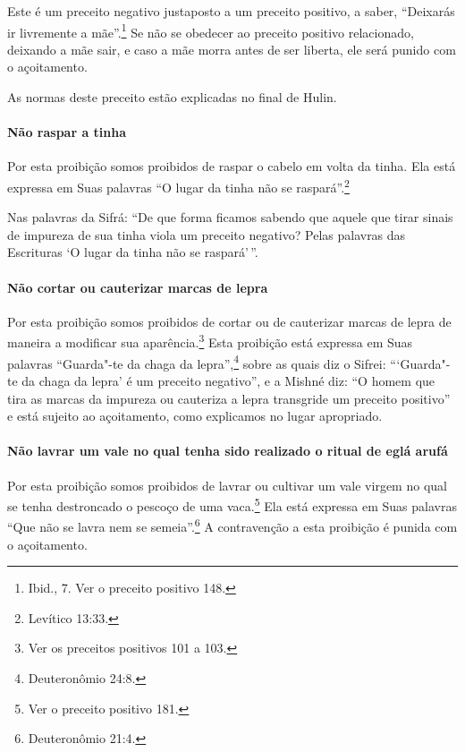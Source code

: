 \begin{multicols}{2}
Este é um preceito negativo justaposto a um preceito positivo, a saber,
``Deixarás ir livremente a mãe''.\footnote{Ibid., 7. Ver o preceito positivo 148.} Se não
se obedecer ao preceito positivo relacionado, deixando a mãe sair, e caso a mãe morra antes de ser liberta, ele será punido com o açoitamento.

As normas deste preceito estão explicadas no final de Hulin\starr.

\paragraph{Não raspar a tinha}

Por esta proibição somos proibidos de raspar o cabelo em volta da tinha.
Ela está expressa em Suas palavras ``O lugar da tinha não se raspará''.\footnote{Levítico 13:33.}

Nas palavras da Sifrá\starr: ``De que forma ficamos sabendo que aquele que
tirar sinais de impureza de sua tinha viola um preceito negativo? Pelas
palavras das Escrituras `O lugar da tinha não se raspará'\,''.

\paragraph{Não cortar ou cauterizar marcas de lepra}

Por esta proibição somos proibidos de cortar ou de cauterizar marcas de lepra de maneira a modificar sua aparência.\footnote{Ver os preceitos positivos 101 a 103.}
Esta proibição está expressa em Suas palavras ``Guarda"-te da chaga da
lepra'',\footnote{Deuteronômio 24:8.} sobre as quais diz o Sifrei\starr: ```Guarda"-te
da chaga da lepra' é um preceito negativo'', e a Mishné diz: ``O homem
que tira as marcas da impureza ou cauteriza a lepra transgride um
preceito positivo'' e está sujeito ao açoitamento, como explicamos no
lugar apropriado.

\paragraph{Não lavrar um vale no qual tenha sido realizado o ritual de eglá arufá\starr}

Por esta proibição somos proibidos de lavrar ou cultivar um vale virgem
no qual se tenha destroncado o pescoço de uma
vaca.\footnote{Ver o preceito positivo 181.} Ela está expressa em Suas palavras ``Que
não se lavra nem se semeia''.\footnote{Deuteronômio 21:4.} A contravenção a esta
proibição é punida com o açoitamento.


\end{multicols}
